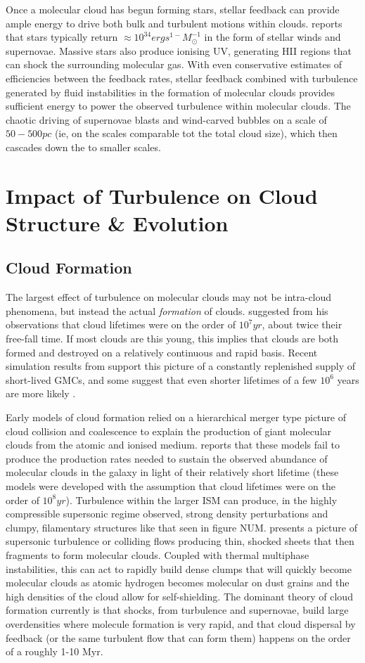 \documentclass[12pt, preprint]{aastex}
\begin{document}
Once a molecular cloud has begun forming stars, stellar feedback can provide
ample energy to drive both bulk and turbulent motions within clouds.
\citet{agertz2012} reports that stars typically return 
$\approx 10^{34} erg s^{1-} M_\odot^{-1}$ in the form of stellar winds and
supernovae.  Massive stars also produce ionising UV, generating HII regions that
can shock the surrounding molecular gas.  With even conservative estimates of
efficiencies between the feedback rates, stellar feedback combined with
turbulence generated by fluid instabilities in the formation of molecular clouds
provides sufficient energy to power the observed turbulence within molecular
clouds\citep{elm2004}.  The chaotic driving of supernovae blasts and wind-carved
bubbles on a scale of $50-500pc$ (ie, on the scales comparable tot the total
cloud size), which then cascades down the to smaller scales.
\section{Impact of Turbulence on Cloud Structure \& Evolution}
\subsection{Cloud Formation}
The largest effect of turbulence on molecular clouds may not be intra-cloud
phenomena, but instead the actual \textit{formation} of clouds.
\citet{larson1981} suggested from his observations that cloud lifetimes were on
the order of $10^7 yr$, about twice their free-fall time.  If most clouds are
this young, this implies that clouds are both formed and destroyed on a
relatively continuous and rapid basis. Recent simulation results from
\citet{hopk2011} support this picture of a constantly replenished supply of
short-lived GMCs, and some suggest that even shorter lifetimes of a few $10^6$
years are more likely \cite{mac2004}.

Early models of cloud formation relied on a hierarchical merger type picture of
cloud collision and coalescence to explain the production of giant molecular
clouds from the atomic and ionised medium.  \citet{larson1981} reports that
these models fail to produce the production rates needed to sustain the observed
abundance of molecular clouds in the galaxy in light of their relatively short
lifetime (these models were developed with the assumption that cloud lifetimes
were on the order of $10^8 yr$).  Turbulence within the larger ISM can produce, 
in the highly compressible supersonic regime observed, strong density perturbations and
clumpy, filamentary structures like that seen in figure NUM.  \citet{val2004}
presents a picture of supersonic turbulence or colliding flows producing thin, 
shocked sheets that then fragments to form molecular clouds. Coupled with
thermal multiphase instabilities, this can act to rapidly build dense clumps
that will quickly become molecular clouds as atomic hydrogen becomes molecular
on dust grains and the high densities of the cloud allow for self-shielding.
The dominant theory of cloud formation currently is that shocks, from turbulence
and supernovae, build large overdensities where molecule formation is very
rapid, and that cloud dispersal by feedback (or the same turbulent flow that
can form them) happens on the order of a roughly 1-10 Myr.
\end{document}
